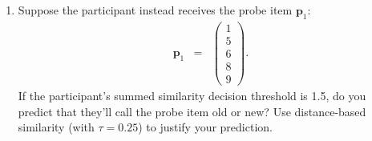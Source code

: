 \documentclass[11pt]{article}
\begin{document}
\begin{enumerate}
\begin{enumerate}
\item Suppose the participant instead receives the probe item
  $\mathbf{p}_1$:
\begin{eqnarray*}
\mathbf{p}_1&=&
\left( 
\begin{array}{c}
1\\
5\\
6\\
8\\
9
\end{array} 
\right).
\end{eqnarray*}
If the participant's summed similarity decision threshold is 1.5, do you predict
that they'll call the probe item old or new?  Use distance-based
similarity (with $\tau = 0.25$) to justify your prediction.


\end{enumerate}


\end{enumerate}
\end{document}
